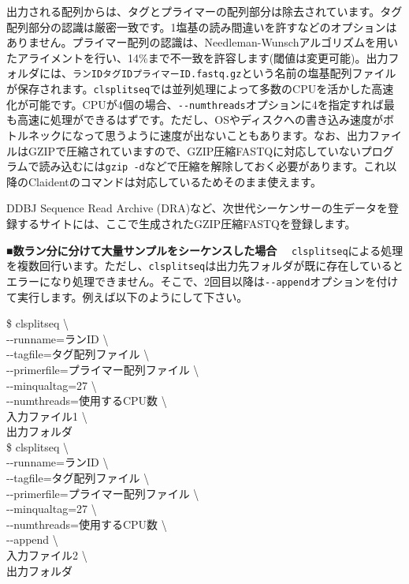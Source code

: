 \documentclass[titlepage,10pt,a4paper,english]{jsbook}
\newenvironment{cmd}{\begin{oframed}\raggedright\ttfamily\footnotesize\setlength{\baselineskip}{1.4em}}{\end{oframed}\vspace{-1em}}
\begin{document}
出力される配列からは、タグとプライマーの配列部分は除去されています。タグ配列部分の認識は厳密一致です。1塩基の読み間違いを許すなどのオプションはありません。プライマー配列の認識は、Needleman-Wunschアルゴリズムを用いたアライメントを行い、14\%まで不一致を許容します(閾値は変更可能)。出力フォルダには、\texttt{ランID{\textunderscore}{\textunderscore}タグID{\textunderscore}{\textunderscore}プライマーID.fastq.gz}という名前の塩基配列ファイルが保存されます。\texttt{clsplitseq}では並列処理によって多数のCPUを活かした高速化が可能です。CPUが4個の場合、\texttt{{-}{-}numthreads}オプションに4を指定すれば最も高速に処理ができるはずです。ただし、OSやディスクへの書き込み速度がボトルネックになって思うように速度が出ないこともあります。なお、出力ファイルはGZIPで圧縮されていますので、GZIP圧縮FASTQに対応していないプログラムで読み込むには\texttt{gzip -d}などで圧縮を解除しておく必要があります。これ以降のClaidentのコマンドは対応しているためそのまま使えます。

DDBJ Sequence Read Archive (DRA)など、次世代シーケンサーの生データを登録するサイトには、ここで生成されたGZIP圧縮FASTQを登録します。

\textbf{■数ラン分に分けて大量サンプルをシーケンスした場合　}
\texttt{clsplitseq}による処理を複数回行います。ただし、\texttt{clsplitseq}は出力先フォルダが既に存在しているとエラーになり処理できません。そこで、2回目以降は\texttt{{-}{-}append}オプションを付けて実行します。例えば以下のようにして下さい。
\begin{cmd}
\$ clsplitseq {\textbackslash}\\
{-}{-}runname=ランID {\textbackslash}\\
{-}{-}tagfile=タグ配列ファイル {\textbackslash}\\
{-}{-}primerfile=プライマー配列ファイル {\textbackslash}\\
{-}{-}minqualtag=27 {\textbackslash}\\
{-}{-}numthreads=使用するCPU数 {\textbackslash}\\
入力ファイル1 {\textbackslash}\\
出力フォルダ\\
\$ clsplitseq {\textbackslash}\\
{-}{-}runname=ランID {\textbackslash}\\
{-}{-}tagfile=タグ配列ファイル {\textbackslash}\\
{-}{-}primerfile=プライマー配列ファイル {\textbackslash}\\
{-}{-}minqualtag=27 {\textbackslash}\\
{-}{-}numthreads=使用するCPU数 {\textbackslash}\\
{-}{-}append {\textbackslash}\\
入力ファイル2 {\textbackslash}\\
出力フォルダ
\end{cmd}
\end{document}
